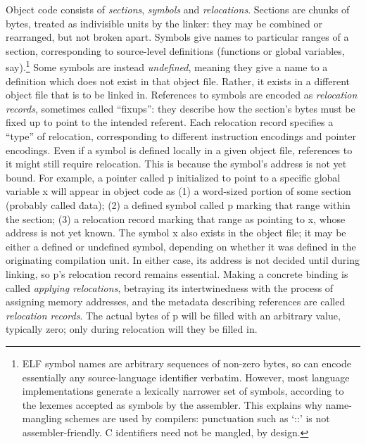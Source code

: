 Object code consists of \emph{sections}, \emph{symbols} and \emph{relocations}.
Sections are chunks of bytes, treated as indivisible units
by the linker: they may be combined or rearranged, but not broken apart. 
Symbols give names to particular ranges of a section, 
corresponding to source-level definitions
(functions or global variables, say).\footnote{ELF symbol names
are arbitrary sequences of non-zero bytes, so can encode 
essentially any source-language identifier verbatim. However, 
most language implementations generate a lexically narrower set of symbols,
according to the lexemes accepted as symbols by the assembler.
This explains why name-mangling schemes are used by \Cplusplus{} compilers: 
\Cplusplus{} punctuation such as `\textsf{::}' is not assembler-friendly. C identifiers 
need not be mangled, by design.} 
Some symbols are instead \emph{undefined},
meaning they give a name to a definition which does not exist 
in that object file. 
Rather, it exists in a different object file that is to be linked in.
References to symbols are encoded as \emph{relocation records}, sometimes called 
``fixups'': they describe how 
the section's bytes must be fixed up to point to the intended referent.
Each relocation record specifies a ``type'' of relocation, corresponding to 
different instruction encodings and pointer encodings.
Even if a symbol is defined locally in a given object file, 
references to it might still require relocation.
This is because the symbol's address is not yet bound.
For example, a pointer called \textsf{p} 
initialized to point to a specific global variable \textsf{x}
will appear in object code as
(1) a word-sized portion of some section (probably called \textsf{\.data});
(2) a defined symbol called \textsf{p} marking that range within the section; 
(3) a relocation record marking that range as pointing to \textsf{x},
whose address is not yet known.
The symbol \textsf{x} also exists in the object file; it 
may be either a defined or undefined symbol, 
depending on whether it was defined in the originating compilation unit.
In either case, its address is not decided until during linking, so 
\textsf{p}'s relocation record remains essential.
Making a concrete binding is called \emph{applying relocations}, 
betraying its intertwinedness with the process of assigning memory addresses,
and the metadata describing references are called \emph{relocation records}.
The actual bytes of \textsf{p} will be filled with an arbitrary value,
typically zero; only during relocation will they be filled in.


